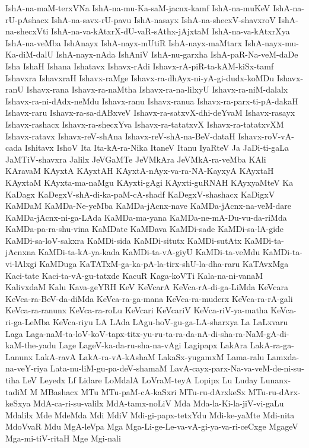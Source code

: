 {IshA-na-maM-terxVNa
IshA-na-mu-Ka-saM-jacnx-kamf
IshA-na-muKeV
IshA-na-rU-pAshacx
IshA-na-savx-rU-pavu
IshA-nasayx
IshA-na-shecxV-shavxroV
IshA-na-shecxVti
IshA-na-va-kAtxrX-dU-vaR-sAthx-jAjxtaM
IshA-na-va-kAtxrXya
IshA-na-veMba
IshAnayx
IshA-nayx-mUtiR
IshA-nayx-maMtarx
IshA-nayx-mu-Ka-diM-dalU
IshA-nayx-nAda
IshAniV
IshA-nu-garxha
IshA-paR-Na-veM-daDe
Isha
IshaH
Ishana
Ishatavx
Ishavx-rAdi
Ishavx-rA-piR-ta-kAM-kiSx-tamf
Ishavxra
IshavxraH
Ishavx-raMge
Ishavx-ra-dhAyx-ni-yA-gi-dudx-koMDu
Ishavx-ranU
Ishavx-rana
Ishavx-ra-naMtha
Ishavx-ra-na-lilxyU
Ishavx-ra-niM-dalalx
Ishavx-ra-ni-dAdx-neMdu
Ishavx-ranu
Ishavx-ranua
Ishavx-ra-parx-ti-pA-dakaH
Ishavx-raru
Ishavx-ra-sa-dABxveV
Ishavx-ra-satxvX-dhi-deYvaM
Ishavx-rasayx
Ishavx-rashacx
Ishavx-ra-shecxYva
Ishavx-ra-tatatxvX
Ishavx-ra-tatatxvXM
Ishavx-ratavx
Ishavx-reV-shAna
Ishavx-reV-shA-na-BeV-dataH
Ishavx-roV-vA-cada
Ishitavx
IshoV
Ita
Ita-kA-ra-Nika
ItaneV
Itanu
IyaRteV
Ja
JaDi-ti-gaLa
JaMTiV-shavxra
Jalilx
JeVGaMTe
JeVMkAra
JeVMkA-ra-veMba
KAli
KAravaM
KAyxtA
KAyxtAH
KAyxtA-nAyx-va-ra-NA-KayxyA
KAyxtaH
KAyxtaM
KAyxta-ma-naMgu
KAyxti-gAgi
KAyxti-guRNAH
KAyxyaMteV
Ka
KaDagx
KaDegxV-shA-di-ka-paM-cA-shadf
KaDegxV-shashacx
KaDigxV
KaMDaM
KaMDa-Ne-yeMba
KaMDa-jAcnx-nave
KaMDa-jAcnx-na-veM-dare
KaMDa-jAcnx-ni-ga-LAda
KaMDa-ma-yana
KaMDa-ne-mA-Du-vu-da-riMda
KaMDa-pa-ra-shu-vina
KaMDate
KaMDava
KaMDi-sade
KaMDi-sa-lA-gide
KaMDi-sa-loV-sakxra
KaMDi-sida
KaMDi-situtx
KaMDi-sutAtx
KaMDi-ta-jAcnxna
KaMDi-ta-kA-ya-kada
KaMDi-ta-vA-giyU
KaMDi-ta-veMdu
KaMDi-ta-vi-lAlxgi
KaMDuga
KaTATxM-ga-ka-pA-la-tirx-shU-la-dha-raru
KaTAvxMga
Kaci-tate
Kaci-ta-vA-gu-tatxde
KacuR
Kaga-koVTi
Kala-na-ni-vanaM
KalivxdaM
Kalu
Kava-geYRH
KeV
KeVcarA
KeVca-rA-di-ga-LiMda
KeVcara
KeVca-ra-BeV-da-diMda
KeVca-ra-ga-mana
KeVca-ra-muderx
KeVca-ra-rA-gali
KeVca-ra-ranunx
KeVca-ra-roLu
KeVcari
KeVcariV
KeVca-riV-ya-matha
KeVca-ri-ga-LeMba
KeVca-riyu
LA
LAda
LAgu-hoV-gu-ga-LA-sharxya
La
LaLxvaru
Laga
Laga-naM-ta-loV-koV-tapx-titx-yu-ru-ta-ra-da-nA-di-sha-ra-NaM-gA-di-kaM-the-yadu
Lage
LageV-ka-da-ru-sha-na-vAgi
Lagipapx
LakAra
LakA-ra-ga-Lanunx
LakA-ravA
LakA-ra-vA-kAshaM
LakaSx-yugamxM
Lama-ralu
Lamxda-na-veY-riya
Lata-nu-liM-gu-pa-deV-shamaM
LavA-cayx-parx-Na-va-veM-de-ni-su-tiha
LeV
Leyedx
Lf
Lidare
LoMdalA
LoVraM-teyA
Lopipx
Lu
Luday
Lunanx-tadiM
M
MBashacx
MTu
MTu-paM-cA-kaSxri
MTu-ru-dArxkeSx
MTu-ru-dArx-keSxya
MdA-ca-ri-su-valilx
MdA-tamx-noLiV
Mda
Mda-la-Ki-la-jiV-vi-gaLu
Mdalilx
Mde
MdeMda
Mdi
MdiV
Mdi-gi-papx-tetxYdu
Mdi-ke-yaMte
Mdi-nita
MdoVvaR
Mdu
MgA-leVpa
Mga
Mga-Li-ge-Le-va-vA-gi-ya-va-ri-ceCxge
MgageV
Mga-mi-tiV-ritaH
Mge
Mgi-nali
}
